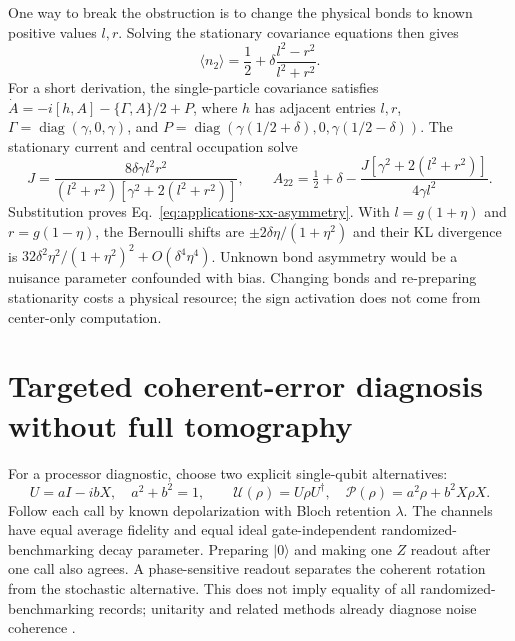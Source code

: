 One way to break the obstruction is to change the physical bonds to known
positive values $l,r$. Solving the stationary covariance equations then gives
\begin{equation}
 \langle n_2\rangle=\frac12+\delta\frac{l^2-r^2}{l^2+r^2}.
 \label{eq:applications-xx-asymmetry}
\end{equation}
For a short derivation, the single-particle covariance satisfies
$\dot A=-i[h,A]-\{\Gamma,A\}/2+P$, where $h$ has adjacent entries $l,r$,
$\Gamma=\operatorname{diag}(\gamma,0,\gamma)$, and
$P=\operatorname{diag}(\gamma(1/2+\delta),0,\gamma(1/2-\delta))$.
The stationary current and central occupation solve
\[
 J=\frac{8\delta\gamma l^2r^2}
 {(l^2+r^2)[\gamma^2+2(l^2+r^2)]},\qquad
 A_{22}=\tfrac12+\delta-
 \frac{J[\gamma^2+2(l^2+r^2)]}{4\gamma l^2}.
\]
Substitution proves Eq.~\eqref{eq:applications-xx-asymmetry}.
With $l=g(1+\eta)$ and $r=g(1-\eta)$, the Bernoulli shifts are
$\pm 2\delta\eta/(1+\eta^2)$ and their KL divergence is
$32\delta^2\eta^2/(1+\eta^2)^2+O(\delta^4\eta^4)$.
Unknown bond asymmetry would be a nuisance parameter confounded with bias.
Changing bonds and re-preparing stationarity costs a physical resource;
the sign activation does not come from center-only computation.

\section{Targeted coherent-error diagnosis without full tomography}
\label{sec:applications-qubit}

For a processor diagnostic, choose two explicit single-qubit alternatives:
\begin{equation}
 U=aI-ibX,\quad a^2+b^2=1,\qquad
 \mathcal U(\rho)=U\rho U^\dagger,\quad
 \mathcal P(\rho)=a^2\rho+b^2X\rho X.
\end{equation}
Follow each call by known depolarization with Bloch retention $\lambda$.
The channels have equal average fidelity and equal ideal gate-independent
randomized-benchmarking decay parameter. Preparing $|0\rangle$ and making
one $Z$ readout after one call also agrees. A phase-sensitive readout separates
the coherent rotation from the stochastic alternative. This does not imply
equality of all randomized-benchmarking records; unitarity and related methods
already diagnose noise coherence \cite{physics-wallman}.

